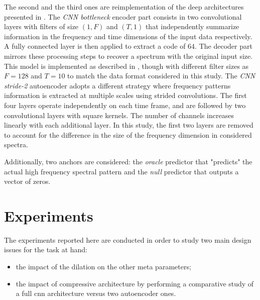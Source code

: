 \documentclass{article}
\begin{document}
The second and the third ones are reimplementation of the deep architectures presented in \cite{miron2018high}. The \textit{CNN bottleneck} encoder part consists in two convolutional layers with filters of size $(1, F)$ and $(T, 1)$ that independently summarize information in the frequency and time dimensions of the input data respectively. A fully connected layer is then applied to extract a code of $64$. The decoder part mirrors these processing steps to recover a spectrum with the original input size. This model is implemented as described in \cite{miron2018high}, though with different filter sizes as $F=128$ and $T=10$ to match the data format considered in this study. The \textit{CNN stride-2} autoencoder adopts a different strategy where frequency patterns information is extracted at multiple scales using strided convolutions. The first four layers operate independently on each time frame, and are followed by two convolutional layers with square kernels. The number of channels increases linearly with each additional layer. In this study, the first two layers are removed to account for the difference in the size of the frequency dimension in considered spectra. %


Additionally, two anchors are considered: the \textit{oracle} predictor that "predicts" the actual high frequency spectral pattern and the \textit{null} predictor that outputs a vector of zeros.

\section{Experiments}
\label{sec:experiments}

The experiments reported here are conducted in order to study two main design issues for the task at hand:
\begin{itemize}
  \item the impact of the dilation on the other meta parameters;
 \item the impact of compressive architecture by performing a comparative study of a full cnn architecture versus two autoencoder ones.
\end{itemize}
\end{document}
